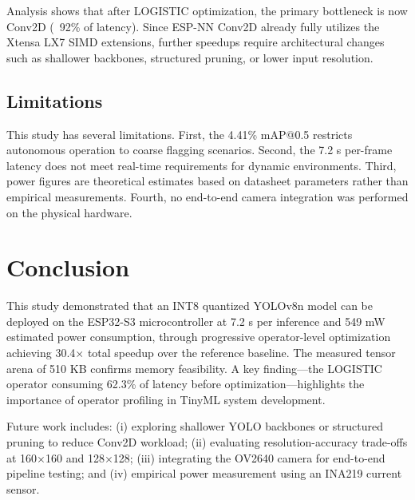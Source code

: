 \documentclass[10pt,twocolumn]{article}
\begin{document}
Analysis shows that after LOGISTIC optimization, the primary bottleneck is now Conv2D (~92\% of latency). Since ESP-NN Conv2D already fully utilizes the Xtensa LX7 SIMD extensions, further speedups require architectural changes such as shallower backbones, structured pruning, or lower input resolution.

\subsection{Limitations}

This study has several limitations. First, the 4.41\% mAP@0.5 restricts autonomous operation to coarse flagging scenarios. Second, the 7.2 s per-frame latency does not meet real-time requirements for dynamic environments. Third, power figures are theoretical estimates based on datasheet parameters rather than empirical measurements. Fourth, no end-to-end camera integration was performed on the physical hardware.

\section{Conclusion}
\label{sec:conclusion}

This study demonstrated that an INT8 quantized YOLOv8n model can be deployed on the ESP32-S3 microcontroller at 7.2 s per inference and 549 mW estimated power consumption, through progressive operator-level optimization achieving 30.4$\times$ total speedup over the reference baseline. The measured tensor arena of 510 KB confirms memory feasibility. A key finding---the LOGISTIC operator consuming 62.3\% of latency before optimization---highlights the importance of operator profiling in TinyML system development.

Future work includes: (i) exploring shallower YOLO backbones or structured pruning to reduce Conv2D workload; (ii) evaluating resolution-accuracy trade-offs at 160$\times$160 and 128$\times$128; (iii) integrating the OV2640 camera for end-to-end pipeline testing; and (iv) empirical power measurement using an INA219 current sensor.



\end{document}
